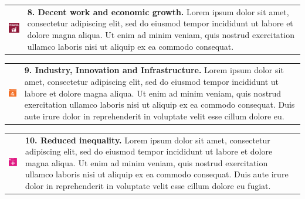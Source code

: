     \noindent
    \begin{tabular}{p{25mm} p{125mm}}
        \vspace{0mm} \includegraphics[width=2cm]{text/appendix/appendix-sdg/resources/sdg8.pdf} & \vspace{-0.5mm} \textbf{8. Decent work and economic growth.} Lorem ipsum dolor sit amet, consectetur adipiscing elit, sed do eiusmod tempor incididunt ut labore et dolore magna aliqua. Ut enim ad minim veniam, quis nostrud exercitation ullamco laboris nisi ut aliquip ex ea commodo consequat. \\
    \end{tabular}

    \noindent
    \begin{tabular}{p{25mm} p{125mm}}
        \vspace{0mm} \includegraphics[width=2cm]{text/appendix/appendix-sdg/resources/sdg9.pdf} & \vspace{-0.5mm} \textbf{9. Industry, Innovation and Infrastructure.} Lorem ipsum dolor sit amet, consectetur adipiscing elit, sed do eiusmod tempor incididunt ut labore et dolore magna aliqua. Ut enim ad minim veniam, quis nostrud exercitation ullamco laboris nisi ut aliquip ex ea commodo consequat. Duis aute irure dolor in reprehenderit in voluptate velit esse cillum dolore eu. \\
    \end{tabular}

    \noindent
    \begin{tabular}{p{25mm} p{125mm}}
        \vspace{0mm} \includegraphics[width=2cm]{text/appendix/appendix-sdg/resources/sdg10.pdf} & \vspace{-0.5mm} \textbf{10. Reduced inequality.} Lorem ipsum dolor sit amet, consectetur adipiscing elit, sed do eiusmod tempor incididunt ut labore et dolore magna aliqua. Ut enim ad minim veniam, quis nostrud exercitation ullamco laboris nisi ut aliquip ex ea commodo consequat. Duis aute irure dolor in reprehenderit in voluptate velit esse cillum dolore eu fugiat. \\ 
    \end{tabular}

